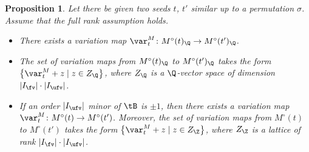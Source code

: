 \documentclass[pdftex]{sigma}
\newcommand{\Mc}{M^\circ}
\newcommand{\Iufv}{I_{\ufv}}
\numberwithin{equation}{section}
\newtheorem{Proposition}[Theorem]{Proposition}
 { \theoremstyle{definition}
\newtheorem{Definition}[Theorem]{Definition}
\newtheorem{Note}[Theorem]{Note}
\newtheorem{Example}[Theorem]{Example}
\newtheorem{Remark}[Theorem]{Remark}
\newtheorem{Assumption}[Theorem]{Assumption}
}
\begin{document}
\begin{Proposition}\label{prop:exist_linear_variation}
Let there be given two seeds $t$, $t'$ similar up to a permutation $\sigma$.
Assume that the full rank assumption holds.
\begin{itemize}\itemsep=0pt
\item[$(1)$] There exists a variation map $\var_{t}^{M}\colon\Mc(t)_{\Q}\rightarrow\Mc(t')_{\Q}$.
\item[$(2)$] The set of variation maps from $\Mc(t)_{\Q}$ to $\Mc(t')_{\Q}$
takes the form $\bigl\{\var_{t}^{M}+z\mid z\in Z_{\Q}\bigr\}$, where $Z_{\Q}$ is a $\Q$-vector space
of dimension $|I_{\fv}|\cdot|\Iufv|$.
\item[$(3)$] If an order $|\Iufv|$ minor of $\tB$ is $\pm1$, then there
exists a variation map $\var_{t}^{M}\colon\Mc(t)\rightarrow\Mc(t')$. Moreover,
the set of variation maps from $\Mc(t)$ to $\Mc(t')$ takes the form
$\bigl\{\var_{t}^{M}\allowbreak+z\mid z\in Z_{\Z}\bigr\}$, where $Z_{\Z}$ is a lattice of rank $|I_{\fv}|\cdot|\Iufv|$.
\end{itemize}
\end{Proposition}
\end{document}
